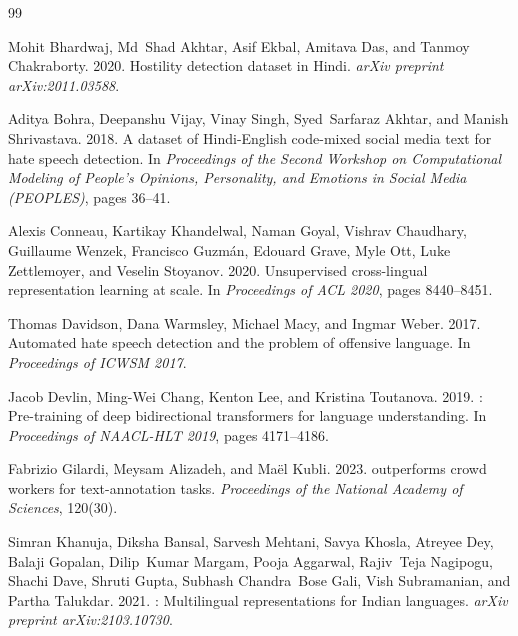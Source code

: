 \documentclass[11pt,a4paper]{article}
\begin{document}
\begin{thebibliography}{99}

Mohit Bhardwaj, Md~Shad Akhtar, Asif Ekbal, Amitava Das, and Tanmoy Chakraborty. 2020.
\newblock Hostility detection dataset in {Hindi}.
\newblock \emph{arXiv preprint arXiv:2011.03588}.

Aditya Bohra, Deepanshu Vijay, Vinay Singh, Syed~Sarfaraz Akhtar, and Manish Shrivastava. 2018.
\newblock A dataset of {Hindi-English} code-mixed social media text for hate speech detection.
\newblock In \emph{Proceedings of the Second Workshop on Computational Modeling of People's Opinions, Personality, and Emotions in Social Media (PEOPLES)}, pages 36--41.

Alexis Conneau, Kartikay Khandelwal, Naman Goyal, Vishrav Chaudhary, Guillaume Wenzek, Francisco Guzm{\'a}n, Edouard Grave, Myle Ott, Luke Zettlemoyer, and Veselin Stoyanov. 2020.
\newblock Unsupervised cross-lingual representation learning at scale.
\newblock In \emph{Proceedings of ACL 2020}, pages 8440--8451.

Thomas Davidson, Dana Warmsley, Michael Macy, and Ingmar Weber. 2017.
\newblock Automated hate speech detection and the problem of offensive language.
\newblock In \emph{Proceedings of ICWSM 2017}.

Jacob Devlin, Ming-Wei Chang, Kenton Lee, and Kristina Toutanova. 2019.
: Pre-training of deep bidirectional transformers for language understanding.
\newblock In \emph{Proceedings of NAACL-HLT 2019}, pages 4171--4186.

Fabrizio Gilardi, Meysam Alizadeh, and Ma{\"e}l Kubli. 2023.
 outperforms crowd workers for text-annotation tasks.
\newblock \emph{Proceedings of the National Academy of Sciences}, 120(30).

Simran Khanuja, Diksha Bansal, Sarvesh Mehtani, Savya Khosla, Atreyee Dey, Balaji Gopalan, Dilip~Kumar Margam, Pooja Aggarwal, Rajiv~Teja Nagipogu, Shachi Dave, Shruti Gupta, Subhash Chandra~Bose Gali, Vish Subramanian, and Partha Talukdar. 2021.
: Multilingual representations for {Indian} languages.
\newblock \emph{arXiv preprint arXiv:2103.10730}.


\end{thebibliography}
\end{document}
